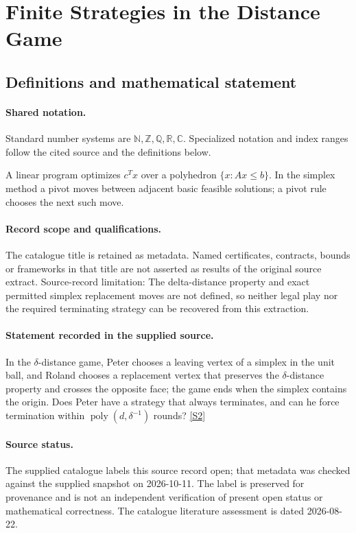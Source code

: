 \documentclass[11pt]{article}
\newcommand{\sref}[2]{\hyperlink{source:#1:#2}{[S#2]}}
\begin{document}
\section{Finite Strategies in the Distance Game}\label{statement}

\subsection{Definitions and mathematical statement}

\paragraph{Shared notation.}Standard number systems are $\mathbb N,\mathbb Z,\mathbb Q,\mathbb R,\mathbb C$. Specialized notation and index ranges follow the cited source and the definitions below.


A linear program optimizes $c^Tx$ over a polyhedron $\{x:Ax\leq b\}$. In the simplex method a pivot moves between adjacent basic feasible solutions; a pivot rule chooses the next such move.
\paragraph{Record scope and qualifications.}
The catalogue title is retained as metadata. Named certificates, contracts, bounds or frameworks in that title are not asserted as results of the original source extract.
Source-record limitation: The delta-distance property and exact permitted simplex replacement moves are not defined, so neither legal play nor the required terminating strategy can be recovered from this extraction.
\paragraph{Statement recorded in the supplied source.}
In the $\delta$-distance game, Peter chooses a leaving vertex of a simplex in the unit ball, and Roland chooses a replacement vertex that preserves the $\delta$-distance property and crosses the opposite face; the game ends when the simplex contains the origin. Does Peter have a strategy that always terminates, and can he force termination within $\operatorname{poly}(d,\delta^{-1})$ rounds? \sref{statement}{2}
\paragraph{Source status.}
The supplied catalogue labels this source record open; that metadata was checked against the supplied snapshot on 2026-10-11. The label is preserved for provenance and is not an independent verification of present open status or mathematical correctness. The catalogue literature assessment is dated 2026-08-22.
\end{document}
